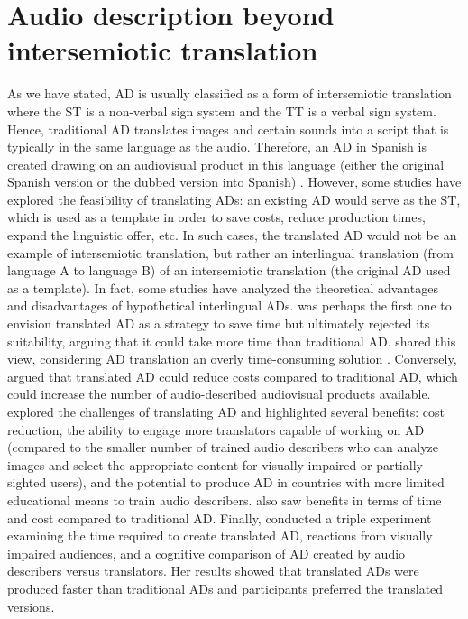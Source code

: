 \documentclass[english]{textolivre}
\begin{document}
\section{Audio description beyond intersemiotic translation}\label{sec-conduta}
As we have stated, AD is usually classified as a form of intersemiotic translation where the ST is a non-verbal sign system and the TT is a verbal sign system. Hence, traditional AD translates images and certain sounds into a script that is typically in the same language as the audio. Therefore, an AD in Spanish is created drawing on an audiovisual product in this language (either the original Spanish version or the dubbed version into Spanish) \cite{aenor2005}. However, some studies have explored the feasibility of translating ADs: an existing AD would serve as the ST, which is used as a template in order to save costs, reduce production times, expand the linguistic offer, etc. In such cases, the translated AD would not be an example of intersemiotic translation, but rather an interlingual translation (from language A to language B) of an intersemiotic translation (the original AD used as a template). In fact, some studies have analyzed the theoretical advantages and disadvantages of hypothetical interlingual ADs. \textcite{hyks2005} was perhaps the first one to envision translated AD as a strategy to save time but ultimately rejected its suitability, arguing that it could take more time than traditional AD. \textcite{vanderheijden2007} shared this view, considering AD translation an overly time-consuming solution \cite{remael-vercauteren2010}. Conversely, \textcite{lopez_vera2006} argued that translated AD could reduce costs compared to traditional AD, which could increase the number of audio-described audiovisual products available. \textcite{remael-vercauteren2010} explored the challenges of translating AD and highlighted several benefits: cost reduction, the ability to engage more translators capable of working on AD (compared to the smaller number of trained audio describers who can analyze images and select the appropriate content for visually impaired or partially sighted users), and the potential to produce AD in countries with more limited educational means to train audio describers. \textcite{bourne2007} also saw benefits in terms of time and cost compared to traditional AD. Finally, \textcite{jankowska2015} conducted a triple experiment examining the time required to create translated AD, reactions from visually impaired audiences, and a cognitive comparison of AD created by audio describers versus translators. Her results showed that translated ADs were produced faster than traditional ADs and participants preferred the translated versions.
\end{document}
